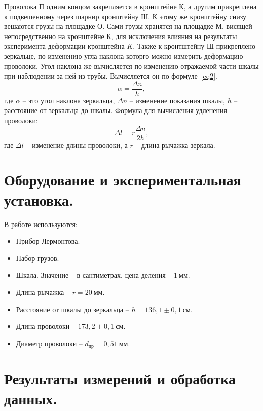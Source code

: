 \documentclass[a4paper,11pt]{article}
\begin{document}
Проволока $П$ одним концом закрепляется в кронштейне $К$, а другим прикреплена к подвешенному через шарнир кронштейну $Ш$. К этому же кронштейну снизу вешаются грузы на площадке $О$. Сами грузы хранятся на площадке $М$, висящей непосредственно на кронштейне $К$, для исключения влияния на результаты эксперимента деформации кронштейна $K$. Также к кронтштейну $Ш$ прикреплено зеркальце, по изменению угла наклона которго можно измерить деформацию проволоки. Угол наклона же вычисляется по изменению отражаемой части шкалы при наблюдении за ней из трубы. Вычисляется он по формуле~\ref{eq2}.
\begin{equation}    \label{eq2}
  \alpha = \frac{\Delta n}{h},
\end{equation}
где $\alpha$ -- это угол наклона зеркальца, $\Delta n$ -- изменение показания шкалы, $h$ -- расстояние от зеркальца до шкалы.
Формула для вычисления удленения проволоки:
\begin{equation}    \label{eq3}
  \Delta l = r \frac{\Delta n}{2h},
\end{equation}
где $\Delta l$ -- изменение длины проволоки, а $r$ -- длина рычажка зеркала.
\section{Оборудование и экспериментальная установка.}
В работе используются:
\begin{itemize}
  \item Прибор Лермонтова.
  \item Набор грузов.
  \item Шкала. Значение -- в сантиметрах, цена деления -- $1\ мм$.
  \item Длина рычажка -- $r = 20\ мм$.
  \item Расстояние от шкалы до зеркальца -- $h = 136,1 \pm 0,1\ см$.
  \item Длина проволоки -- $173,2 \pm 0,1\ см$.
  \item Диаметр проволоки -- $d_{пр} = 0,51\ мм$.
\end{itemize}
\section{Результаты измерений и обработка данных.}
\end{document}
